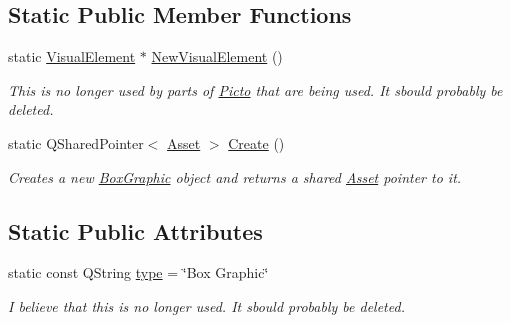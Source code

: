 \subsection*{Static Public Member Functions}
\begin{DoxyCompactItemize}
\item 
\hypertarget{class_picto_1_1_box_graphic_ae2dd718e46b24c973ebc2a6f26e7f8fc}{static \hyperlink{struct_picto_1_1_visual_element}{Visual\-Element} $\ast$ \hyperlink{class_picto_1_1_box_graphic_ae2dd718e46b24c973ebc2a6f26e7f8fc}{New\-Visual\-Element} ()}\label{class_picto_1_1_box_graphic_ae2dd718e46b24c973ebc2a6f26e7f8fc}

\begin{DoxyCompactList}\small\item\em This is no longer used by parts of \hyperlink{namespace_picto}{Picto} that are being used. It sbould probably be deleted. \end{DoxyCompactList}\item 
\hypertarget{class_picto_1_1_box_graphic_a8818cf5af45475599cd04ae093765d86}{static Q\-Shared\-Pointer$<$ \hyperlink{class_picto_1_1_asset}{Asset} $>$ \hyperlink{class_picto_1_1_box_graphic_a8818cf5af45475599cd04ae093765d86}{Create} ()}\label{class_picto_1_1_box_graphic_a8818cf5af45475599cd04ae093765d86}

\begin{DoxyCompactList}\small\item\em Creates a new \hyperlink{class_picto_1_1_box_graphic}{Box\-Graphic} object and returns a shared \hyperlink{class_picto_1_1_asset}{Asset} pointer to it. \end{DoxyCompactList}\end{DoxyCompactItemize}
\subsection*{Static Public Attributes}
\begin{DoxyCompactItemize}
\item 
\hypertarget{class_picto_1_1_box_graphic_a2b319121464fe4275fb506edd2737c93}{static const Q\-String \hyperlink{class_picto_1_1_box_graphic_a2b319121464fe4275fb506edd2737c93}{type} = \char`\"{}Box Graphic\char`\"{}}\label{class_picto_1_1_box_graphic_a2b319121464fe4275fb506edd2737c93}

\begin{DoxyCompactList}\small\item\em I believe that this is no longer used. It sbould probably be deleted. \end{DoxyCompactList}\end{DoxyCompactItemize}
